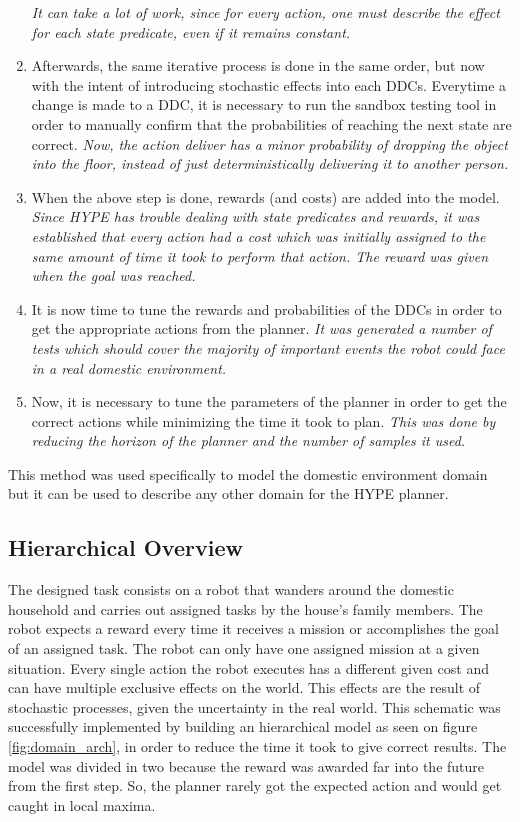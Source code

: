 \begin{enumerate}
  \textit{It can take a lot of work, since for every action, one must describe the 
  effect for each state predicate, even if it remains constant.}
  \item Afterwards, the same iterative process is done in the same order, but now 
  with the intent of introducing stochastic effects into each \glspl{DDC}. Everytime
  a change is made to a \gls{DDC}, it is necessary to run the sandbox testing tool in 
  order to manually confirm that the probabilities of reaching the next state are correct.
  \textit{Now, the action deliver has a minor probability of dropping the object 
  into the floor, instead of just deterministically delivering it to another person.}
  \item When the above step is done, rewards (and costs) are added into the model. 
  \textit{Since \gls{HYPE} has trouble dealing with state predicates and rewards, it was 
  established that every action had a cost which was initially assigned to the same amount
  of time it took to perform that action. The reward was given when the goal was reached.}
  \item It is now time to tune the rewards and probabilities of the \glspl{DDC} in order 
  to get the appropriate actions from the planner.
  \textit{It was generated a number of tests which should cover the majority of important 
  events the robot could face in a real domestic environment.}
  \item Now, it is necessary to tune the parameters of the planner in order to get the 
  correct actions while minimizing the time it took to plan.
  \textit{This was done by reducing the horizon of the planner and the number of samples it 
  used.}
  

\end{enumerate}

This method was used specifically to model the domestic environment domain but it 
can be used to describe any other domain for the \gls{HYPE} planner.

\subsection{Hierarchical Overview}

The designed task consists on a robot that wanders around the domestic household
and carries out assigned tasks by the house's family members. The robot expects
a reward every time it receives a mission or accomplishes the goal of an
assigned task. The robot can only have one assigned mission at a given
situation. Every single action the robot executes has a different given cost and
can have multiple exclusive effects on the world. This effects are the result of
stochastic processes, given the uncertainty in the real world.
This schematic was successfully implemented by building an hierarchical model as
seen on figure \ref{fig:domain_arch}, in order to reduce the time it took to give correct 
results. The model was divided in two because the reward was awarded far into the future 
from the first step. So, the planner rarely got the expected action and would get caught
in local maxima. 


